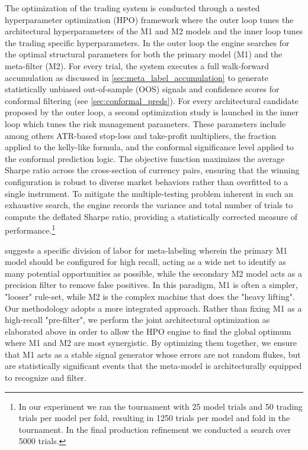 \documentclass[12pt, a4paper]{article}
\begin{document}
The optimization of the trading system is conducted through a nested hyperparameter optimization (HPO) framework where the outer loop tunes the architectural hyperparameters of the M1 and M2 
models and the inner loop tunes the trading specific hyperparameters. In the outer loop the engine searches for the optimal structural parameters for both the primary model (M1) 
and the meta-filter (M2). For every trial, the system executes a full walk-forward accumulation as discussed in \ref{sec:meta_label_accumulation} to generate statistically unbiased 
out-of-sample (OOS) signals and confidence scores for conformal filtering (see \ref{sec:conformal_preds}). For every architectural candidate proposed by the outer loop, 
a second optimization study is launched in the inner loop which tunes the risk management parameters. These parameters include among others ATR-based stop-loss and take-profit multipliers, 
the fraction applied to the kelly-like formula, and the conformal significance level applied to the conformal prediction logic.
The objective function maximizes the average Sharpe ratio across the cross-section of currency pairs, ensuring that the winning configuration is robust to diverse market behaviors 
rather than overfitted to a single instrument. To mitigate the multiple-testing problem inherent in such an exhaustive search, the engine records the variance and total number of 
trials to compute the deflated Sharpe ratio, providing a statistically corrected measure of performance.\footnote{In our experiment we ran the tournament with 25 model trials and 
50 trading trials per model per fold, resulting in 1250 trials per model and fold in the tournament. In the final production refinement we conducted a search over 5000 trials.}

\medskip

\textcite{lopez_de_prado_advances_2018} suggests a specific division of labor for meta-labeling wherein the primary M1 model should be configured for high recall, 
acting as a wide net to identify as many potential opportunities as possible, while the secondary M2 model acts as a precision filter to remove false positives. 
In this paradigm, M1 is often a simpler, "looser" rule-set, while M2 is the complex machine that does the "heavy lifting". Our methodology adopts a more integrated approach. 
Rather than fixing M1 as a high-recall "pre-filter", we perform the joint architectural optimization as elaborated above in order to allow the HPO engine to find the global 
optimum where M1 and M2 are most synergistic. By optimizing them together, we ensure that M1 acts as a stable signal generator whose errors are not random flukes, but
are statistically significant events that the meta-model is architecturally equipped to recognize and filter.
\end{document}
